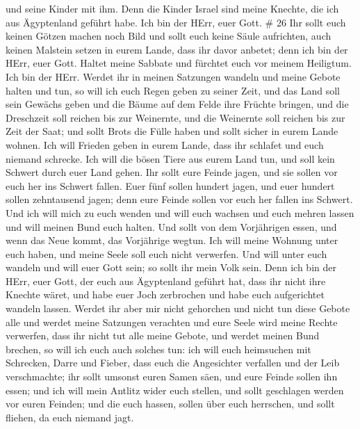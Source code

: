 und seine Kinder mit ihm.  Denn die Kinder Israel sind
meine Knechte, die ich aus Ägyptenland geführt habe. Ich bin der HErr,
euer Gott. \# 26  Ihr sollt euch keinen Götzen machen noch
Bild und sollt euch keine Säule aufrichten, auch keinen Malstein setzen
in eurem Lande, dass ihr davor anbetet; denn ich bin der HErr, euer
Gott.  Haltet meine Sabbate und fürchtet euch vor meinem
Heiligtum. Ich bin der HErr.  Werdet ihr in meinen Satzungen
wandeln und meine Gebote halten und tun,  so will ich euch
Regen geben zu seiner Zeit, und das Land soll sein Gewächs geben und die
Bäume auf dem Felde ihre Früchte bringen,  und die
Dreschzeit soll reichen bis zur Weinernte, und die Weinernte soll
reichen bis zur Zeit der Saat; und sollt Brots die Fülle haben und sollt
sicher in eurem Lande wohnen.  Ich will Frieden geben in
eurem Lande, dass ihr schlafet und euch niemand schrecke. Ich will die
bösen Tiere aus eurem Land tun, und soll kein Schwert durch euer Land
gehen.  Ihr sollt eure Feinde jagen, und sie sollen vor euch
her ins Schwert fallen.  Euer fünf sollen hundert jagen, und
euer hundert sollen zehntausend jagen; denn eure Feinde sollen vor euch
her fallen ins Schwert.  Und ich will mich zu euch wenden
und will euch wachsen und euch mehren lassen und will meinen Bund euch
halten.  Und sollt von dem Vorjährigen essen, und wenn das
Neue kommt, das Vorjährige wegtun.  Ich will meine Wohnung
unter euch haben, und meine Seele soll euch nicht verwerfen.
 Und will unter euch wandeln und will euer Gott sein; so
sollt ihr mein Volk sein.  Denn ich bin der HErr, euer
Gott, der euch aus Ägyptenland geführt hat, dass ihr nicht ihre Knechte
wäret, und habe euer Joch zerbrochen und habe euch aufgerichtet wandeln
lassen.  Werdet ihr aber mir nicht gehorchen und nicht tun
diese Gebote alle  und werdet meine Satzungen verachten und
eure Seele wird meine Rechte verwerfen, dass ihr nicht tut alle meine
Gebote, und werdet meinen Bund brechen,  so will ich euch
auch solches tun: ich will euch heimsuchen mit Schrecken, Darre und
Fieber, dass euch die Angesichter verfallen und der Leib verschmachte;
ihr sollt umsonst euren Samen säen, und eure Feinde sollen ihn essen;
 und ich will mein Antlitz wider euch stellen, und sollt
geschlagen werden vor euren Feinden; und die euch hassen, sollen über
euch herrschen, und sollt fliehen, da euch niemand jagt. 
